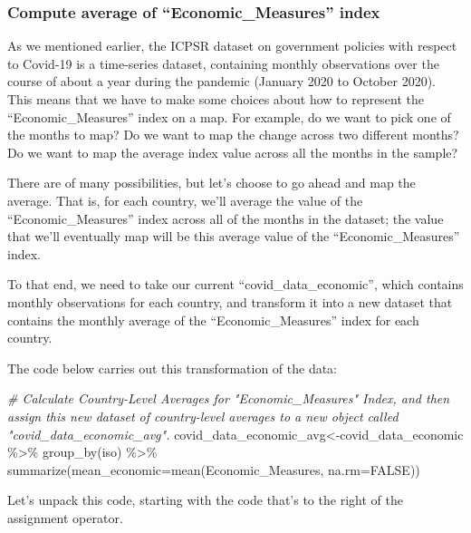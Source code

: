 \documentclass[
]{article}
\newenvironment{Shaded}{\begin{snugshade}}{\end{snugshade}}
\newcommand{\AttributeTok}[1]{\textcolor[rgb]{0.77,0.63,0.00}{#1}}
\newcommand{\CommentTok}[1]{\textcolor[rgb]{0.56,0.35,0.01}{\textit{#1}}}
\newcommand{\ConstantTok}[1]{\textcolor[rgb]{0.00,0.00,0.00}{#1}}
\newcommand{\FunctionTok}[1]{\textcolor[rgb]{0.00,0.00,0.00}{#1}}
\newcommand{\NormalTok}[1]{#1}
\newcommand{\OtherTok}[1]{\textcolor[rgb]{0.56,0.35,0.01}{#1}}
\newcommand{\SpecialCharTok}[1]{\textcolor[rgb]{0.00,0.00,0.00}{#1}}
\begin{document}
\hypertarget{compute-average-of-economic_measures-index}{%
\subsubsection{Compute average of ``Economic\_Measures'' index}\label{compute-average-of-economic_measures-index}}

As we mentioned earlier, the ICPSR dataset on government policies with respect to Covid-19 is a time-series dataset, containing monthly observations over the course of about a year during the pandemic (January 2020 to October 2020). This means that we have to make some choices about how to represent the ``Economic\_Measures'' index on a map. For example, do we want to pick one of the months to map? Do we want to map the change across two different months? Do we want to map the average index value across all the months in the sample?

There are of many possibilities, but let's choose to go ahead and map the average. That is, for each country, we'll average the value of the ``Economic\_Measures'' index across all of the months in the dataset; the value that we'll eventually map will be this average value of the ``Economic\_Measures'' index.

To that end, we need to take our current ``covid\_data\_economic'', which contains monthly observations for each country, and transform it into a new dataset that contains the monthly average of the ``Economic\_Measures'' index for each country.

The code below carries out this transformation of the data:

\begin{Shaded}
\begin{Highlighting}[]
\CommentTok{\# Calculate Country{-}Level Averages for "Economic\_Measures" Index, and then assign this new dataset of country{-}level averages to a new object called "covid\_data\_economic\_avg". }
\NormalTok{covid\_data\_economic\_avg}\OtherTok{\textless{}{-}}\NormalTok{covid\_data\_economic }\SpecialCharTok{\%\textgreater{}\%} \FunctionTok{group\_by}\NormalTok{(iso) }\SpecialCharTok{\%\textgreater{}\%} 
                                                \FunctionTok{summarize}\NormalTok{(}\AttributeTok{mean\_economic=}\FunctionTok{mean}\NormalTok{(Economic\_Measures, }\AttributeTok{na.rm=}\ConstantTok{FALSE}\NormalTok{))}
\end{Highlighting}
\end{Shaded}

Let's unpack this code, starting with the code that's to the right of the assignment operator.
\end{document}
